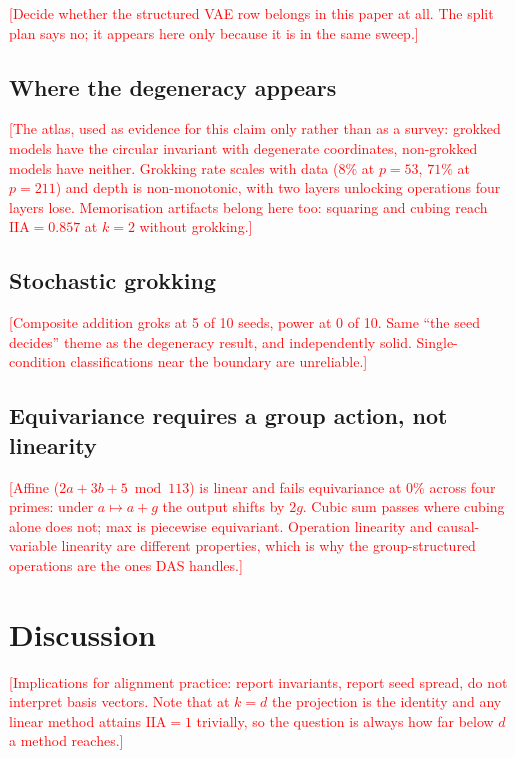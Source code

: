 \documentclass[11pt]{article}
\newcommand{\IIA}{\mathrm{IIA}}
\newcommand{\TODO}[1]{\textcolor{red}{[#1]}}
\begin{document}
\TODO{Decide whether the structured VAE row belongs in this paper at all. The
split plan says no; it appears here only because it is in the same sweep.}

\subsection{Where the degeneracy appears}

\TODO{The atlas, used as evidence for this claim only rather than as a survey:
grokked models have the circular invariant with degenerate coordinates,
non-grokked models have neither. Grokking rate scales with data ($8\%$ at $p=53$,
$71\%$ at $p=211$) and depth is non-monotonic, with two layers unlocking
operations four layers lose. Memorisation artifacts belong here too: squaring and
cubing reach $\IIA = 0.857$ at $k=2$ without grokking.}

\subsection{Stochastic grokking}

\TODO{Composite addition groks at 5 of 10 seeds, power at 0 of 10. Same
``the seed decides'' theme as the degeneracy result, and independently solid.
Single-condition classifications near the boundary are unreliable.}

\subsection{Equivariance requires a group action, not linearity}

\TODO{Affine ($2a + 3b + 5 \bmod 113$) is linear and fails equivariance at $0\%$
across four primes: under $a \mapsto a+g$ the output shifts by $2g$. Cubic sum
passes where cubing alone does not; max is piecewise equivariant. Operation
linearity and causal-variable linearity are different properties, which is why
the group-structured operations are the ones DAS handles.}

\section{Discussion}

\TODO{Implications for alignment practice: report invariants, report seed spread,
do not interpret basis vectors. Note that at $k = d$ the projection is the
identity and any linear method attains $\IIA = 1$ trivially, so the question is
always how far below $d$ a method reaches.}
\end{document}
